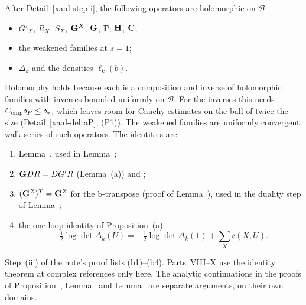 \begin{detail}
\begin{step}
After Detail~\ref{xa:d-step-i}, the following operators are holomorphic on $\mathcal B$:
\begin{itemize}
\item $G'_X$, $R_X$, $S_X$, $\mathbf G^X$, $\mathbf G$, $\boldsymbol\Gamma$, $\mathbf H$, $\mathbf C$;
\item the weakened families at $s=1$;
\item $\Delta_k$ and the densities $\ell_k(b)$.
\end{itemize}
Holomorphy holds because each is a composition and inverse of holomorphic families with inverses bounded uniformly on $\mathcal B$. For the inverses this needs $C_{\rm cmp}\delta_P\le\delta_*$, which leaves room for Cauchy estimates on the ball of twice the size (Detail~\ref{xa:d-deltaP}, (P1)). The weakened families are uniformly convergent walk series of such operators. The identities are:
\begin{enumerate}[label=(b\arabic*)]
\item Lemma~, used in Lemma~;
\item $\mathbf G DR=DG'R$ (Lemma~(a)) and ;
\item $(\mathbf G^Z)^T=\mathbf G^Z$ for the $\mathrm b$-transpose (proof of Lemma~), used in the duality step of Lemma~;
\item the one-loop identity of Proposition~(a):
\[
-\tfrac12\log\det\Delta_k(U)=-\tfrac12\log\det\Delta_k(1)+\sum_X\mathfrak e(X,U).
\]
\end{enumerate}
Step~(iii) of the note's proof lists (b1)--(b4). Parts~VIII--X use the identity theorem at complex references only here. The analytic continuations in the proofs of Proposition~, Lemma~ and Lemma~ are separate arguments, on their own domains.
\end{step}


\end{detail}
